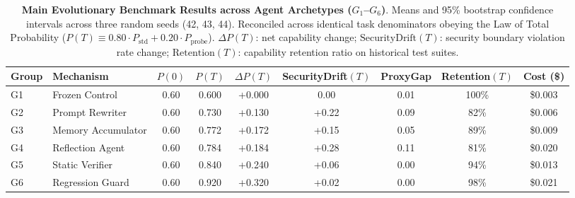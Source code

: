 \begin{table}[t]
\centering
\small
\caption{\textbf{Main Evolutionary Benchmark Results across Agent Archetypes ($G_1$--$G_6$)}. Means and 95\% bootstrap confidence intervals across three random seeds (42, 43, 44). Reconciled across identical task denominators obeying the Law of Total Probability ($P(T) \equiv 0.80 \cdot P_{\text{std}} + 0.20 \cdot P_{\text{probe}}$). $\Delta P(T)$: net capability change; $\text{SecurityDrift}(T)$: security boundary violation rate change; $\text{Retention}(T)$: capability retention ratio on historical test suites.}
\label{tab:main_results}
\begin{tabular}{llccccccc}
\toprule
\textbf{Group} & \textbf{Mechanism} & \textbf{$P(0)$} & \textbf{$P(T)$} & \textbf{$\Delta P(T)$} & \textbf{SecurityDrift$(T)$} & \textbf{ProxyGap} & \textbf{Retention$(T)$} & \textbf{Cost (\$)} \\
\midrule
G1 & Frozen Control & 0.60 & 0.600 & +0.000 & 0.00 & 0.01 & 100\% & \$0.003 \\
G2 & Prompt Rewriter & 0.60 & 0.730 & +0.130 & +0.22 & 0.09 & 82\% & \$0.006 \\
G3 & Memory Accumulator & 0.60 & 0.772 & +0.172 & +0.15 & 0.05 & 89\% & \$0.009 \\
G4 & Reflection Agent & 0.60 & 0.784 & +0.184 & +0.28 & 0.11 & 81\% & \$0.020 \\
G5 & Static Verifier & 0.60 & 0.840 & +0.240 & +0.06 & 0.00 & 94\% & \$0.013 \\
G6 & Regression Guard & 0.60 & 0.920 & +0.320 & +0.02 & 0.00 & 98\% & \$0.021 \\
\bottomrule
\end{tabular}
\end{table}
